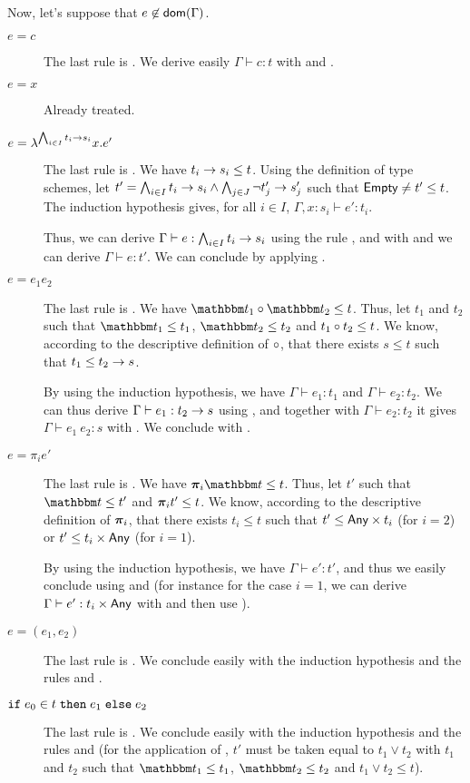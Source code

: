 \documentclass[a4paper]{article}
\theoremstyle{definition}
\begin{document}
  Now, let's suppose that $e\not\in\textsf{dom}(\Gamma)$.

  \begin{description}
    \item[$e=c$] The last rule is . We derive easily $\Gamma \vdash c:t$ with  and .
    \item[$e=x$] Already treated.
    \item[$e=\lambda^{\bigwedge_{i\in I} t_i\to s_i}x.e'$]
    The last rule is .
    We have $t_i\to s_i \leq t$.
    Using the definition of type schemes, let $t'=\bigwedge_{i\in I} t_i\to s_i \land \bigwedge_{j\in J} \neg t'_j\to s'_j$ such that $\textsf{Empty} \neq t' \leq t$.
    The induction hypothesis gives, for all $i\in I$, $\Gamma,x:s_i\vdash e':t_i$.
    
    Thus, we can derive $\Gamma\vdash e:\bigwedge_{i\in I} t_i\to s_i$ using the rule , and with  and
     we can derive $\Gamma\vdash e:t'$. We can conclude by applying .
    \item[$e=e_1 e_2$] The last rule is .
    We have $\apply {\ts_1} {\ts_2} \leq t$. Thus, let $t_1$ and $t_2$ such that $\ts_1 \leq t_1$, $\ts_2 \leq t_2$ and $t_1\circ t_2 \leq t$.
    We know, according to the descriptive definition of $\circ$, that there exists $s\leq t$ such that $t_1 \leq t_2\to s$.

    By using the induction hypothesis, we have $\Gamma\vdash e_1:t_1$ and $\Gamma\vdash e_2:t_2$. We can thus derive
    $\Gamma\vdash e_1:t_2\to s$ using , and together with $\Gamma\vdash e_2:t_2$ it gives
    $\Gamma\vdash e_1\ e_2:s$ with . We conclude with .

    \item[$e=\pi_i e'$] The last rule is . We have $\bpi_i \ts \leq t$. Thus, let $t'$ such that $\ts \leq t'$ and $\boldsymbol{\pi}_i t' \leq t$.
    We know, according to the descriptive definition of $\boldsymbol{\pi}_i$, that there exists $t_i\leq t$ such that $t' \leq \textsf{Any}\times t_i$ (for $i=2$) or $t' \leq t_i\times \textsf{Any}$ (for $i=1$).
    
    By using the induction hypothesis, we have $\Gamma\vdash e':t'$, and thus we easily conclude using  and 
    (for instance for the case $i=1$, we can derive $\Gamma\vdash e':t_i\times \textsf{Any}$ with  and then use ).

    \item[$e=(e_1,e_2)$] The last rule is . We conclude easily with the induction hypothesis and the rules  and .

    \item[$\texttt{if}\;e_0\in t\;\texttt{then}\;e_1\;\texttt{else}\;e_2$] The last rule is . We conclude easily with the induction hypothesis and the rules
     and  (for the application of , $t'$ must be taken equal to $t_1 \vee t_2$ with $t_1$ and $t_2$ such that $\ts_1\leq t_1$, $\ts_2\leq t_2$ and $t_1 \vee t_2 \leq t$).
  \end{description}\ \\
\end{document}
